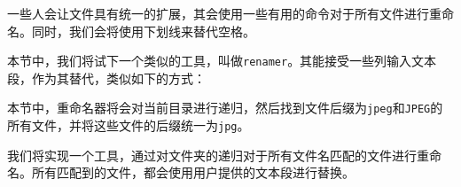 一些人会让文件具有统一的扩展，其会使用一些有用的命令对于所有文件进行重命名。同时，我们会将使用下划线来替代空格。

本节中，我们将试下一个类似的工具，叫做\texttt{renamer}。其能接受一些列输入文本段，作为其替代，类似如下的方式：


本节中，重命名器将会对当前目录进行递归，然后找到文件后缀为\texttt{jpeg}和\texttt{JPEG}的所有文件，并将这些文件的后缀统一为\texttt{jpg}。


我们将实现一个工具，通过对文件夹的递归对于所有文件名匹配的文件进行重命名。所有匹配到的文件，都会使用用户提供的文本段进行替换。

